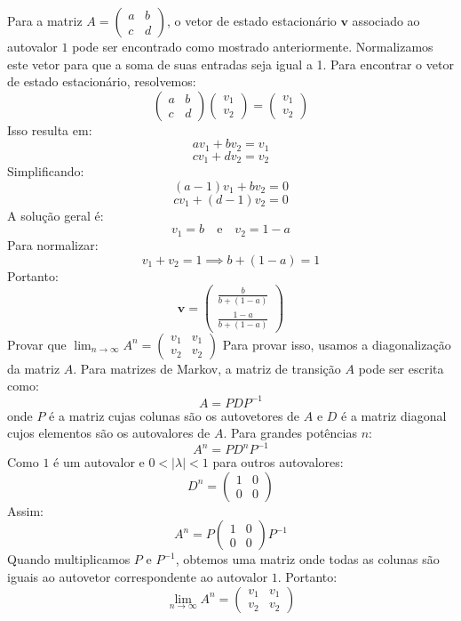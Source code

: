 {{{Para a matriz \(A = \begin{pmatrix} a & b \\ c & d \end{pmatrix}\), o vetor de estado estacionário \(\mathbf{v}\) associado ao autovalor \(1\) pode ser encontrado como mostrado anteriormente. Normalizamos este vetor para que a soma de suas entradas seja igual a 1.
Para encontrar o vetor de estado estacionário, resolvemos:
\[ \begin{pmatrix} a & b \\ c & d \end{pmatrix} \begin{pmatrix} v_1 \\ v_2 \end{pmatrix} = \begin{pmatrix} v_1 \\ v_2 \end{pmatrix} \]
Isso resulta em:
\[ av_1 + bv_2 = v_1 \]
\[ cv_1 + dv_2 = v_2 \]
Simplificando:
\[ (a - 1)v_1 + bv_2 = 0 \]
\[ cv_1 + (d - 1)v_2 = 0 \]
A solução geral é:
\[ v_1 = b \quad \text{e} \quad v_2 = 1 - a \]
Para normalizar:
\[ v_1 + v_2 = 1 \implies b + (1 - a) = 1 \]
Portanto:
\[ \mathbf{v} = \begin{pmatrix} \frac{b}{b + (1 - a)} \\ \frac{1 - a}{b + (1 - a)} \end{pmatrix} \]
Provar que \( \lim_{n \to \infty} A^n = \begin{pmatrix} v_1 & v_1 \\ v_2 & v_2 \end{pmatrix} \)
Para provar isso, usamos a diagonalização da matriz \(A\). Para matrizes de Markov, a matriz de transição \(A\) pode ser escrita como:
\[ A = PDP^{-1} \]
onde \(P\) é a matriz cujas colunas são os autovetores de \(A\) e \(D\) é a matriz diagonal cujos elementos são os autovalores de \(A\). Para grandes potências \(n\):
\[ A^n = PD^nP^{-1} \]
Como \(1\) é um autovalor e \(0 < |\lambda| < 1\) para outros autovalores:
\[ D^n = \begin{pmatrix} 1 & 0 \\ 0 & 0 \end{pmatrix} \]
Assim:
\[ A^n = P \begin{pmatrix} 1 & 0 \\ 0 & 0 \end{pmatrix} P^{-1} \]
Quando multiplicamos \(P\) e \(P^{-1}\), obtemos uma matriz onde todas as colunas são iguais ao autovetor correspondente ao autovalor \(1\). Portanto:
\[ \lim_{n \to \infty} A^n = \begin{pmatrix} v_1 & v_1 \\ v_2 & v_2 \end{pmatrix} \]
}}}
